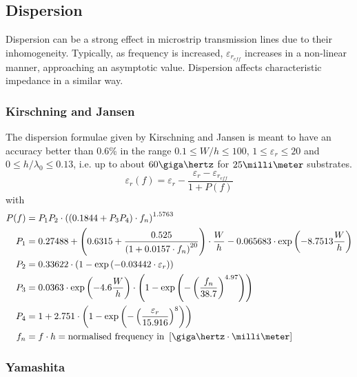 \documentclass[10pt]{report}
\begin{document}
\subsection{Dispersion}

Dispersion can be a strong effect in microstrip transmission lines due
to their inhomogeneity.  Typically, as frequency is increased,
$\varepsilon_{r_{eff}}$ increases in a non-linear manner, approaching
an asymptotic value.  Dispersion affects characteristic impedance in a
similar way.

\subsubsection{Kirschning and Jansen}

The dispersion formulae given by Kirschning and Jansen
\cite{Kirschning3} is meant to have an accuracy better than 0.6\% in
the range $0.1 \le W/h \le 100$, $1\le \varepsilon_r \le 20$ and $0
\le h/\lambda_0 \le 0.13$, i.e. up to about $60\giga\hertz$ for
$25\milli\meter$ substrates.
\begin{equation}
\label{eq:KandJErEff_disp}
\varepsilon_{r}(f) = \varepsilon_{r} - \frac{\varepsilon_{r} - \varepsilon_{r_{eff}}}{1 + P(f)}
\end{equation}
with
\begin{align}
P(f) &= P_{1} P_{2} \cdot\left(\left(0.1844 + P_{3} P_{4}\right) \cdot f_{n}\right)^{1.5763}\\
P_{1} &= 0.27488 + \left(0.6315 + \frac{0.525}{\left(1 + 0.0157\cdot f_{n}\right)^{20}}\right)\cdot \frac{W}{h} - 0.065683 \cdot \exp\left(-8.7513\dfrac{W}{h}\right)\\
P_{2} &= 0.33622\cdot \left(1 - \exp\left(-0.03442 \cdot \varepsilon_{r}\right)\right)\\
P_{3} &= 0.0363 \cdot \exp\left(-4.6\dfrac{W}{h}\right) \cdot \left(1 - \exp\left(- \left(\dfrac{f_{n}}{38.7}\right)^{4.97}\right)\right)\\
P_{4} &= 1 + 2.751 \cdot \left(1 - \exp\left(- \left(\frac{\varepsilon_{r}}{15.916}\right)^{8}\right)\right)\\
f_{n} &= f \cdot h = \text{normalised frequency in } \left[\giga\hertz \cdot \milli\meter\right]
\end{align}

\subsubsection{Yamashita}
\end{document}
